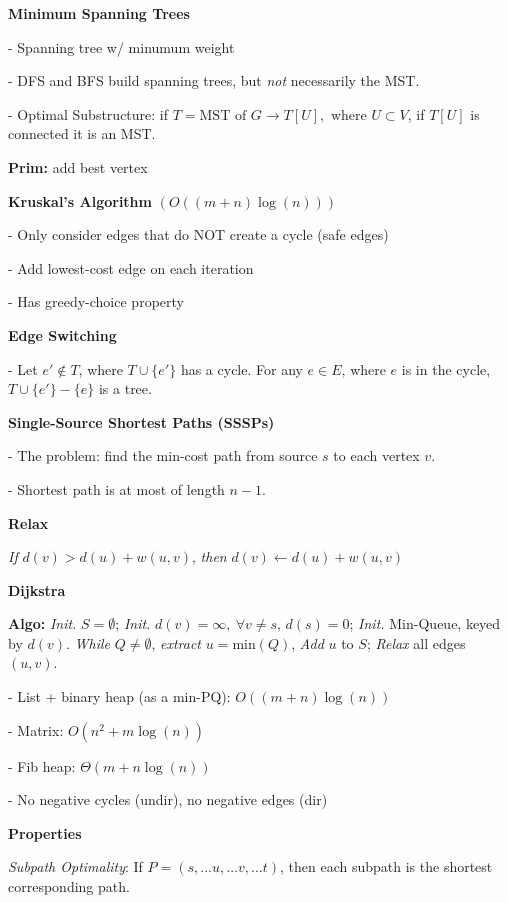 \documentclass[8pt, letterpaper]{extarticle}
\begin{document}
\begin{minipage}[t]{0.45\textwidth}

    
\textbf{Minimum Spanning Trees}

- Spanning tree w/ minumum weight

- DFS and BFS build spanning trees, but \emph{not} necessarily the MST.

- Optimal Substructure: if $T = \text{MST of } G \rightarrow T[U], \text{ where } U \subset V$, if $T[U]$ is connected it is an MST.


\textbf{Prim: } add best vertex


\textbf{Kruskal's Algorithm} $(O((m + n)\log(n)))$

- Only consider edges that do NOT create a cycle (safe edges)

- Add lowest-cost edge on each iteration

- Has greedy-choice property


\textbf{Edge Switching}

- Let $e' \notin T$, where $T \cup \{e'\}$ has a cycle. For any $e \in E$, where $e$ is in the cycle, $T \cup \{e'\} - \{e\}$ is a tree.

\textbf{Single-Source Shortest Paths (SSSPs)}

- The problem: find the min-cost path from source $s$ to each vertex $v$.

- Shortest path is at most of length $n-1$.

\textbf{Relax}

\emph{If} $d(v) > d(u) + w(u, v)$, \emph{then} $d(v) \leftarrow d(u) + w(u, v)$

\textbf{Dijkstra}

{\small \textbf{Algo:}} \emph{Init.} $S = \emptyset$; \emph{Init.} $d(v) = \infty,\ \forall v \neq s$, $d(s) = 0$; \emph{Init.} Min-Queue, keyed by $d(v)$. \emph{While} $Q \neq \emptyset$, \emph{extract} $u = \text{min}(Q)$, \emph{Add} $u$ to $S$; \emph{Relax} all edges $(u,v)$.

- List + binary heap (as a min-PQ): $O((m+n)\log(n))$

- Matrix: $O(n^2 + m\log(n))$

- Fib heap: $\Theta(m + n\log(n))$

- No negative cycles (undir), no negative edges (dir)

\textbf{Properties}

\emph{Subpath Optimality}: If $P = (s,...u,...v,...t)$, then each subpath is the shortest corresponding path.


\end{minipage}
\end{document}
